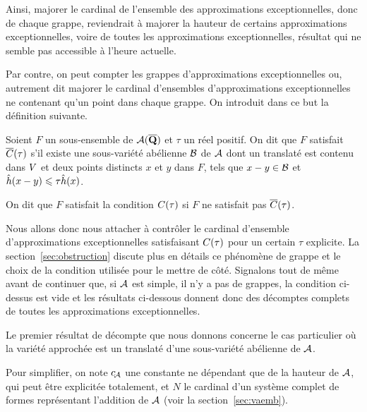 Ainsi, majorer le cardinal de l'ensemble des approximations exceptionnelles,
donc de chaque grappe, reviendrait à majorer la hauteur de certains
approximations exceptionnelles, voire de toutes les approximations
exceptionnelles, résultat qui ne semble pas accessible à l'heure actuelle.

Par contre, on peut compter les grappes d'approximations exceptionnelles ou,
autrement dit majorer le cardinal d'ensembles d'approximations exceptionnelles
ne contenant qu'un point dans chaque grappe. On introduit dans ce but la
définition suivante.

\begin{tdef} \label{d:cond}
  Soient \( F \) un sous-ensemble de \( \mathcal A(\overline{{\mathbf{Q}}}) \) et \( \tau \) un réel
  positif. On dit que \( F \) satisfait \( \cond*\tau \) s'il existe une
  sous-variété abélienne \( \mathcal B \) de \( \mathcal A \) dont un translaté est contenu
  dans \( V \) et deux points distincts \( x \) et \( y \) dans \( F \),
  tels que \( x - y \in \mathcal B \) et \( \hat h ( x-y ) \leqslant \tau \hat h (x) \).

  On dit que \( F \) satisfait la condition \( \cond\tau \) si \( F \) ne
  satisfait pas \( \cond*\tau \).
\end{tdef}

Nous allons donc nous attacher à contrôler le cardinal d'ensemble
d'approximations exceptionnelles satisfaisant \( \cond\tau \) pour un certain
\( \tau \) explicite. La section~\vref{sec:obstruction} discute plus en
détails ce phénomène de grappe et le choix de la condition utilisée pour
le mettre de côté. Signalons tout de même avant de continuer que, si \( \mathcal A
\) est simple, il n'y a pas de grappes, la condition ci-dessus est vide et
les résultats ci-dessous donnent donc des décomptes complets de toutes les
approximations exceptionnelles.

\medskip

Le premier résultat de décompte que nous donnons concerne le cas particulier
où la variété approchée est un translaté d'une sous-variété abélienne de \(
  \mathcal A \).

Pour simplifier, on note \( c_{\!\mathcal A} \) une constante ne dépendant que de la
hauteur de \( \mathcal A \), qui peut être explicitée totalement, et \( N \) le
cardinal d'un système complet de formes représentant l'addition de \( \mathcal A \)
(voir la section~\vref{sec:vaemb}).


